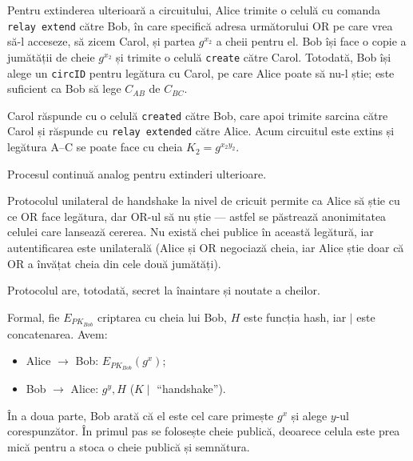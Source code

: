 Pentru extinderea ulterioară a circuitului, Alice trimite o celulă cu
comanda \texttt{relay extend} către Bob, în care specifică adresa
următorului OR pe care vrea să-l acceseze, să zicem Carol, și partea
$ g^{x_2} $ a cheii pentru el. Bob își face o copie a jumătății de cheie
$ g^{x_2} $ și trimite o celulă \texttt{create} către Carol. Totodată,
Bob își alege un \texttt{circID} pentru legătura cu Carol, pe care Alice
poate să nu-l știe; este suficient ca Bob să lege $ C_{AB} $ de $ C_{BC} $.

Carol răspunde cu o celulă \texttt{created} către Bob, care apoi trimite
sarcina către Carol și răspunde cu \texttt{relay extended} către Alice.
Acum circuitul este extins și legătura A--C se poate face cu cheia
$ K_2 = g^{x_2y_2} $.

Procesul continuă analog pentru extinderi ulterioare.

Protocolul unilateral de handshake la nivel de cricuit permite ca Alice să
știe cu ce OR face legătura, dar OR-ul să nu știe --- astfel se
păstrează anonimitatea celulei care lansează cererea. Nu există chei publice
în această legătură, iar autentificarea este unilaterală (Alice și OR
negociază cheia, iar Alice știe doar că OR a învățat cheia din cele
două jumătăți).

Protocolul are, totodată, secret la înaintare și noutate a cheilor.

Formal, fie $ E_{PK_{Bob}} $ criptarea cu cheia lui Bob, $ H $ este funcția
hash, iar $ \mid $ este concatenarea. Avem:
\begin{itemize}
  \item Alice $ \longrightarrow $ Bob: $E_{PK_{Bob}}(g^x) $;
  \item Bob $ \longrightarrow $ Alice: $ g^y, H$ ($ K \mid$ ``handshake'').
\end{itemize}

În a doua parte, Bob arată că el este cel care primește $ g^x $ și alege
$ y $-ul corespunzător. În primul pas se folosește cheie publică, deoarece
celula este prea mică pentru a stoca o cheie publică și semnătura.


